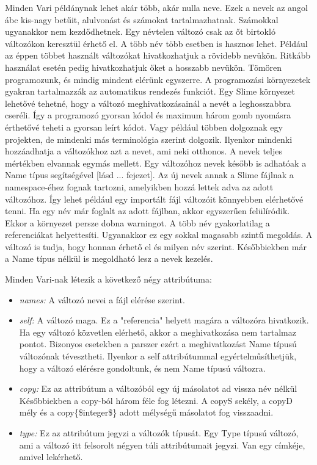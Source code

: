 Minden Vari példánynak lehet akár több, akár nulla neve.
Ezek a nevek az angol ábc kis-nagy betűit, alulvonást és számokat tartalmazhatnak. 
Számokkal ugyanakkor nem kezdődhetnek.
Egy névtelen változó csak az őt birtokló változókon keresztül érhető el.
A több név több esetben is hasznos lehet.
Például az éppen többet használt változókat hivatkozhatjuk a rövidebb nevükön.
Ritkább használat esetén pedig hivatkozhatjuk őket a hosszabb nevükön.
Tömören programozunk, és mindig mindent elérünk egyszerre.
A programozási környezetek gyakran tartalmazzák az automatikus rendezés funkciót.
Egy Slime környezet lehetővé tehetné, hogy a változó meghivatkozásainál a nevét a leghosszabbra cseréli.
Így a programozó gyorsan kódol és maximum három gomb nyomásra érthetővé teheti a gyorsan leírt kódot.
Vagy például többen dolgoznak egy projekten, de mindenki más terminológia szerint dolgozik.
Ilyenkor mindenki hozzáadhatja a változókhoz azt a nevet, ami neki otthonos.
A nevek teljes mértékben elvannak egymás mellett.
Egy változóhoz nevek később is adhatóak a Name típus segítségével [lásd ... fejezet].
Az új nevek annak a Slime fájlnak a namespace-éhez fognak tartozni, amelyikben hozzá lettek adva az adott változóhoz.
Így lehet például egy importált fájl változóit könnyebben elérhetővé tenni.
Ha egy név már foglalt az adott fájlban, akkor egyszerűen felülíródik.
Ekkor a környezet persze dobna warningot.
A több név gyakorlatilag a referenciákat helyettesíti.
Ugyanakkor ez egy sokkal magasabb szintű megoldás.
A változó is tudja, hogy honnan érhető el és milyen név szerint.
Későbbiekben már a Name típus nélkül is megoldható lesz a nevek kezelés.

Minden Vari-nak létezik a következő négy attribútuma:
\begin{itemize}
\item \emph{names:} 
A változó nevei a fájl elérése szerint.
\item \emph{self:} 
A változó maga. 
Ez a "referencia" helyett magára a változóra hivatkozik.
Ha egy változó közvetlen elérhető, akkor a meghivatkozása nem tartalmaz pontot.
Bizonyos esetekben a parszer ezért a meghivatkozást Name típusú változónak tévesztheti.
Ilyenkor a self attribútummal egyértelműsíthetjük, hogy a változó elérésre gondoltunk, és nem Name típusú változra.
\item \emph{copy:}
Ez az attribútum a változóból egy új másolatot ad vissza név nélkül
Későbbiekben a copy-ból három féle fog létezni. 
A copyS sekély, a copyD mély és a copy\{\$integer\$\} adott mélységű másolatot fog visszaadni.
\item \emph{type:}
Ez az attribútum jegyzi a változók típusát.
Egy Type típusú változó, ami a változó itt felsorolt négyen túli attribútumait jegyzi.
Van egy címkéje, amivel lekérhető.
\end{itemize}

